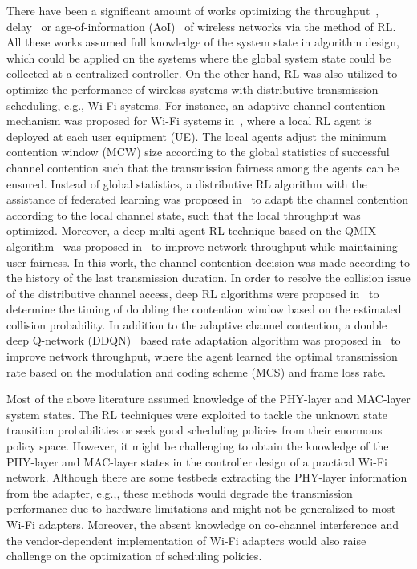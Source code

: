 There have been a significant amount of works optimizing the throughput~\cite{zhang2020drlthoughput,chu2018reinforcement,xu2020buffer}, delay~\cite{zhang2020delay} or age-of-information (AoI)~\cite{abd2020reinforcement,wu2022aoi,9839316} of wireless networks via the method of RL.
All these works assumed full knowledge of the system state in algorithm design, which could be applied on the systems where the global system state could be collected at a centralized controller. On the other hand, RL was also utilized to optimize the performance of wireless systems with distributive transmission scheduling, e.g., Wi-Fi systems. For instance, an adaptive channel contention mechanism was proposed for Wi-Fi systems in~\cite{kumar2021adaptive}, where a local RL agent is deployed at each user equipment (UE). The local agents adjust the minimum contention window (MCW) size according to the global statistics of successful channel contention such that the transmission fairness among the agents can be ensured.
Instead of global statistics, a distributive RL algorithm with the assistance of federated learning was proposed in~\cite{zhang2020enhancing} to adapt the channel contention according to the local channel state, such that the local throughput was optimized. Moreover, a deep multi-agent RL technique based on the QMIX algorithm~\cite{rashid2020monotonic} was proposed in~\cite{guo2022multi} to improve network throughput while maintaining user fairness. In this work, the channel contention decision was made according to the history of the last transmission duration. In order to resolve the collision issue of the distributive channel access, deep RL algorithms were proposed in~\cite{ali2018deep,ali2019q} to determine the timing of doubling the contention window based on the estimated collision probability.
In addition to the adaptive channel contention, a double deep Q-network (DDQN)~\cite{van2016deep} based rate adaptation algorithm was proposed in~\cite{chen2021experience} to improve network throughput, where the agent learned the optimal transmission rate based on the modulation and coding scheme (MCS) and frame loss rate.

Most of the above literature assumed knowledge of the PHY-layer and MAC-layer system states. The RL techniques were exploited to tackle the unknown state transition probabilities or seek good scheduling policies from their enormous policy space. However, it might be challenging to obtain the knowledge of the PHY-layer and MAC-layer states in the controller design of a practical Wi-Fi network. Although there are some testbeds extracting the PHY-layer information from the adapter, e.g.,\cite{chen2021experience}, these methods would degrade the transmission performance due to hardware limitations and might not be generalized to most Wi-Fi adapters. Moreover, the absent knowledge on co-channel interference and the vendor-dependent implementation of Wi-Fi adapters would also raise challenge on the optimization of scheduling policies. 

